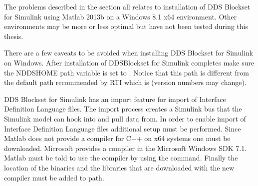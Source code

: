The problems described in the section all relates to installation of DDS Blockset for Simulink using Matlab 2013b on a Windows 8.1 x64 environment.
Other environments may be more or less optimal but have not been tested during this thesis.

There are a few caveats to be avoided when installing DDS Blockset for Simulink on Windows.
After installation of DDSBlockset for Simulink completes make sure the NDDSHOME path variable is set to .
Notice that this path is different from the default path recommended by RTI which is  (version numbers may change).

DDS Blockset for Simulink has an import feature for import of Interface Definition Language files. The import process creates a Simulink bus that the Simulink model can hook into and pull data from. In order to enable import of Interface Definition Language files additional setup must be performed.
Since Matlab does not provide a compiler for C++ on x64 systems one must be downloaded. Microsoft provides a compiler in the Microsoft Windows SDK 7.1. Matlab must be told to use the compiler by using the  command. Finally the location of the binaries and the libraries that are downloaded with the new compiler must be added to path.